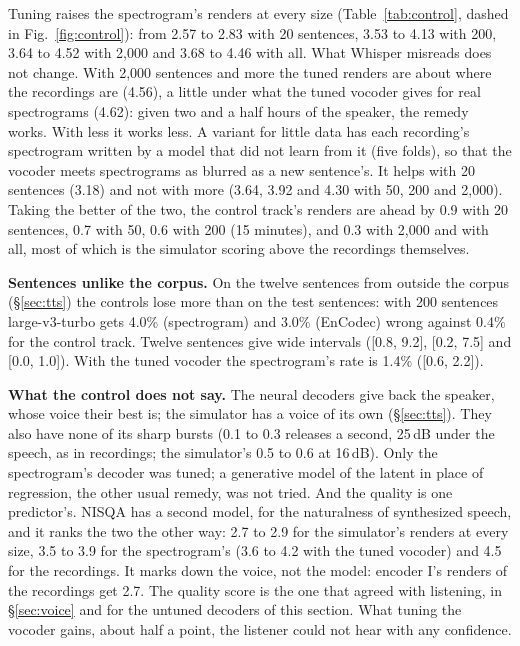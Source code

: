 \documentclass[10pt,a4paper,twocolumn]{article}
\begin{document}
Tuning raises the spectrogram's renders at every size (Table~\ref{tab:control}, dashed in
Fig.~\ref{fig:control}): from 2.57 to 2.83 with 20 sentences, 3.53 to 4.13 with 200, 3.64 to
4.52 with 2,000 and 3.68 to 4.46 with all. What Whisper misreads does not change. With 2,000
sentences and more the tuned renders are about where the recordings are (4.56), a little under
what the tuned vocoder gives for real spectrograms (4.62): given two and a half hours of the
speaker, the remedy works. With less it works less. A variant for little data has each recording's
spectrogram written by a model that did not learn from it (five folds), so that the vocoder
meets spectrograms as blurred as a new sentence's. It helps with 20 sentences (3.18) and not
with more (3.64, 3.92 and 4.30 with 50, 200 and 2,000). Taking the better of the two, the control
track's renders are ahead by 0.9 with 20 sentences, 0.7 with 50, 0.6 with 200 (15 minutes), and
0.3 with 2,000 and with all, most of which is the simulator scoring above the recordings
themselves.

\textbf{Sentences unlike the corpus.} On the twelve sentences from outside the corpus
(\S\ref{sec:tts}) the controls lose more than on the test sentences: with 200 sentences
large-v3-turbo gets 4.0\% (spectrogram) and 3.0\% (EnCodec) wrong against 0.4\% for the control
track. Twelve sentences give wide intervals ([0.8, 9.2], [0.2, 7.5] and [0.0, 1.0]). With the tuned
vocoder the spectrogram's rate is 1.4\% ([0.6, 2.2]).

\textbf{What the control does not say.} The neural decoders give back the speaker, whose voice
their best is; the simulator has a voice of its own (\S\ref{sec:tts}). They also have none of its
sharp bursts (0.1 to 0.3 releases a second, 25\,dB under the speech, as in recordings; the
simulator's 0.5 to 0.6 at 16\,dB). Only the spectrogram's decoder was tuned; a generative model of the latent in place of
regression, the other usual remedy, was not tried. And the quality is one predictor's. NISQA
has a second model, for the naturalness of synthesized speech, and it ranks the two the other
way: 2.7 to 2.9 for the simulator's renders at every size, 3.5 to 3.9 for the spectrogram's
(3.6 to 4.2 with the tuned vocoder) and 4.5 for the recordings. It marks down the voice, not the
model: encoder I's renders of the recordings get 2.7. The quality score is the one that agreed
with listening, in \S\ref{sec:voice} and for the untuned decoders of this section. What tuning the
vocoder gains, about half a point, the listener could not hear with any confidence.
\end{document}
